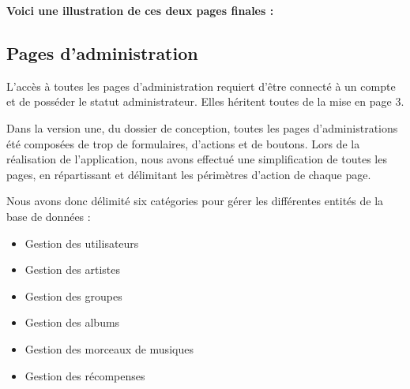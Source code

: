             \begin{paragraphe}
                \textbf{Voici une illustration de ces deux pages finales :}
            \end{paragraphe}



	\clearpage

	\subsection{Pages d'administration}

        \begin{paragraphe}
            L'accès à toutes les pages d'administration requiert d'être connecté à un compte et de posséder le statut administrateur. Elles héritent toutes de la mise en page 3.
        \end{paragraphe}
        
        \begin{paragraphe}
            Dans la version une, du dossier de conception, toutes les pages d'administrations été composées de trop de formulaires, d'actions et de boutons.
            Lors de la réalisation de l'application, nous avons effectué une simplification de toutes les pages, en répartissant et délimitant les périmètres d'action de chaque page.
        \end{paragraphe}
    
        \begin{paragraphe}
            Nous avons donc délimité six catégories pour gérer les différentes entités de la base de données :
            \vspace{1em}
            \begin{itemize}
                \item Gestion des utilisateurs
                \item Gestion des artistes
                \item Gestion des groupes
                \item Gestion des albums
                \item Gestion des morceaux de musiques
                \item Gestion des récompenses
            \end{itemize}
        \end{paragraphe}
        
